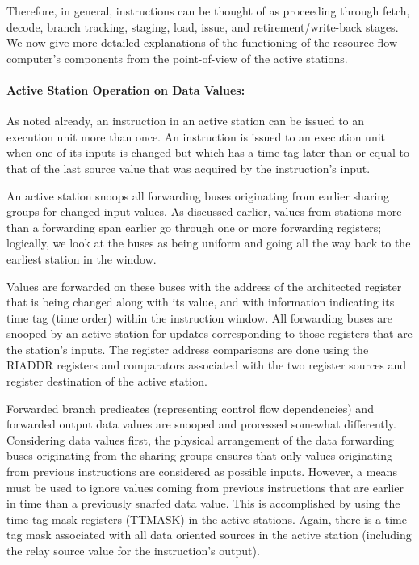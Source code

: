 \documentclass[10pt,dvips]{article}
\begin{document}
Therefore, in
general, instructions can be thought of as proceeding through fetch,
decode, branch tracking, staging, load, issue, and
retirement/write-back stages. We now give more detailed explanations
of the functioning of the resource flow computer's components from the
point-of-view of the active stations.

\paragraph{Active Station Operation on Data Values: }
As noted already, an instruction in an active station can be issued to
an execution unit more than once.  An instruction is issued to an execution
unit when one of its inputs is changed but which has a time tag
later than or equal to that of the last source value
that was acquired by the instruction's input.

An
active station snoops all forwarding buses originating from earlier
sharing groups for changed input values.  As discussed earlier,
values from stations more than a forwarding span earlier go through
one or more forwarding registers; logically, we look at the buses as
being uniform and going all the way back to the earliest station in the
window.

Values are forwarded on these
buses with the address of the architected register that is being
changed along with its value, and with information indicating its
time tag (time order) within the instruction window.  All forwarding
buses are snooped by an active station for updates corresponding to
those registers that are the station's inputs.
The register address comparisons
are done using the RIADDR registers and comparators associated with the
two register sources and register destination of the active station.

Forwarded branch predicates (representing control flow dependencies)
and forwarded output data values are snooped and processed somewhat
differently.  Considering data values first,
the physical arrangement of the data forwarding
buses originating from the sharing groups ensures that
only values originating from
previous instructions are considered as possible inputs.  However, a
means must be used to ignore values coming from previous instructions that
are earlier in time than a previously snarfed data value.  This is
accomplished by using the time tag mask registers (TTMASK) in the
active stations.  Again, there is a time tag mask associated with all
data oriented sources in the active station (including the relay source
value for the instruction's output).
\end{document}
